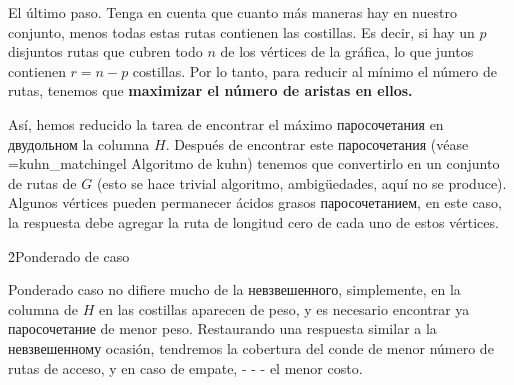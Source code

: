 El último paso. Tenga en cuenta que cuanto más maneras hay en nuestro conjunto, menos todas estas rutas contienen las costillas. Es decir, si hay un $p$ disjuntos rutas que cubren todo $n$ de los vértices de la gráfica, lo que juntos contienen $r = n - p$ costillas. Por lo tanto, para reducir al mínimo el número de rutas, tenemos que \bf{maximizar el número de aristas} en ellos.

Así, hemos reducido la tarea de encontrar el máximo паросочетания en двудольном la columna $H$. Después de encontrar este паросочетания (véase \algohref=kuhn_matching{el Algoritmo de kuhn}) tenemos que convertirlo en un conjunto de rutas de $G$ (esto se hace trivial algoritmo, ambigüedades, aquí no se produce). Algunos vértices pueden permanecer ácidos grasos паросочетанием, en este caso, la respuesta debe agregar la ruta de longitud cero de cada uno de estos vértices.


\h2{Ponderado de caso}

Ponderado caso no difiere mucho de la невзвешенного, simplemente, en la columna de $H$ en las costillas aparecen de peso, y es necesario encontrar ya паросочетание de menor peso. Restaurando una respuesta similar a la невзвешенному ocasión, tendremos la cobertura del conde de menor número de rutas de acceso, y en caso de empate, - - - el menor costo.